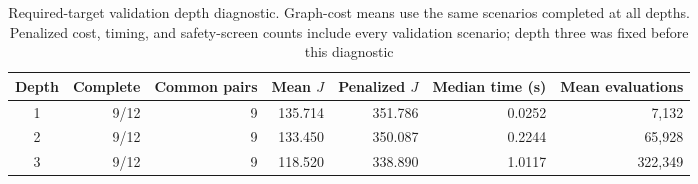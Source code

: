 \begin{table}[t]
  \centering
  \caption{Required-target validation depth diagnostic. Graph-cost means use the same scenarios completed at all depths. Penalized cost, timing, and safety-screen counts include every validation scenario; depth three was fixed before this diagnostic}
  \label{tab:depth-sensitivity}
  \renewcommand{\arraystretch}{1.08}
  \setlength{\tabcolsep}{5pt}
  \footnotesize
  \begin{tabular}{@{}crrrrrr@{}}
    \toprule
    Depth & Complete & Common pairs & Mean $J$ & Penalized $J$ & Median time (s) & Mean evaluations \\
    \midrule
    1 & 9/12 & 9 & 135.714 & 351.786 & 0.0252 & 7,132 \\
    2 & 9/12 & 9 & 133.450 & 350.087 & 0.2244 & 65,928 \\
    3 & 9/12 & 9 & 118.520 & 338.890 & 1.0117 & 322,349 \\
    \bottomrule
  \end{tabular}
\end{table}
